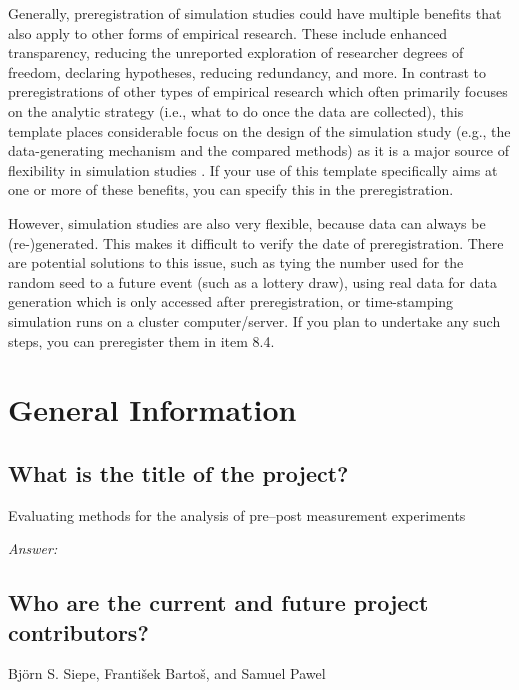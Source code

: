 \documentclass[12pt]{article}
\begin{document}
{Generally, preregistration of simulation studies could have multiple benefits that also apply to other forms of empirical research. These include enhanced transparency, reducing the unreported exploration of researcher degrees of freedom, declaring hypotheses, reducing redundancy, and more. In contrast to preregistrations of other types of empirical research which often primarily focuses on the analytic strategy (i.e., what to do once the data are collected), this template places considerable focus on the design of the simulation study (e.g., the data-generating mechanism and the compared methods) as it is a major source of flexibility in simulation studies \parencite{pawel2024pitfalls}. If your use of this template specifically aims at one or more of these benefits, you can specify this in the preregistration. 

However, simulation studies are also very flexible, because data can always be (re-)generated. This makes it difficult to verify the date of preregistration. There are potential solutions to this issue, such as tying the number used for the random seed to a future event (such as a lottery draw), using real data for data generation which is only accessed after preregistration, or time-stamping simulation runs on a cluster computer/server. If you plan to undertake any such steps, you can preregister them in item 8.4.  
}

\section{General Information}
\subsection{What is the title of the project?}

\begin{examplebox}
Evaluating methods for the analysis of pre--post measurement experiments
\end{examplebox}

\textit{Answer:}

\subsection{Who are the current and future project contributors?}

\begin{examplebox}
    Björn S. Siepe, František Bartoš, and Samuel Pawel
\end{examplebox}
\end{document}
